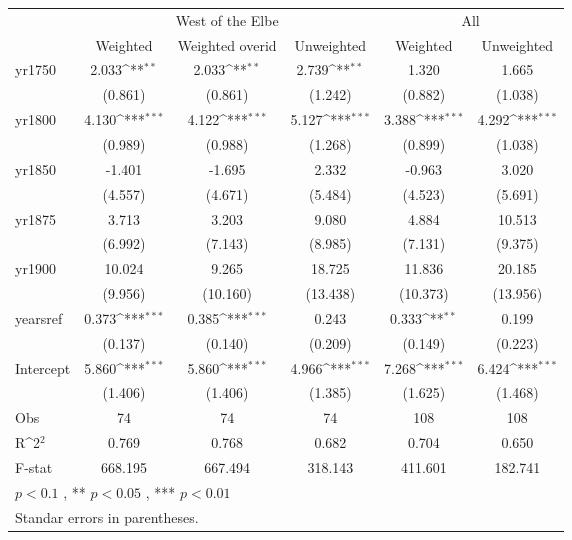 {
\def\sym#1{\ifmmode^{#1}\else\(^{#1}\)\fi}
\begin{tabular}{@{\extracolsep{2pt}}l*{5}{c}@{}}
\hline\hline
& \multicolumn{3}{c}{West of the Elbe} & \multicolumn{2}{c}{All} \\
\cline{2-4}
\cline{5-6}
 & Weighted & Weighted overid & Unweighted & Weighted & Unweighted \\
\hline
yr1750 & 2.033\sym{**} & 2.033\sym{**} & 2.739\sym{**} & 1.320 & 1.665 \\
 & (0.861) & (0.861) & (1.242) & (0.882) & (1.038) \\
yr1800 & 4.130\sym{***} & 4.122\sym{***} & 5.127\sym{***} & 3.388\sym{***} & 4.292\sym{***} \\
 & (0.989) & (0.988) & (1.268) & (0.899) & (1.038) \\
yr1850 & -1.401 & -1.695 & 2.332 & -0.963 & 3.020 \\
 & (4.557) & (4.671) & (5.484) & (4.523) & (5.691) \\
yr1875 & 3.713 & 3.203 & 9.080 & 4.884 & 10.513 \\
 & (6.992) & (7.143) & (8.985) & (7.131) & (9.375) \\
yr1900 & 10.024 & 9.265 & 18.725 & 11.836 & 20.185 \\
 & (9.956) & (10.160) & (13.438) & (10.373) & (13.956) \\
yearsref & 0.373\sym{***} & 0.385\sym{***} & 0.243 & 0.333\sym{**} & 0.199 \\
 & (0.137) & (0.140) & (0.209) & (0.149) & (0.223) \\
Intercept & 5.860\sym{***} & 5.860\sym{***} & 4.966\sym{***} & 7.268\sym{***} & 6.424\sym{***} \\
 & (1.406) & (1.406) & (1.385) & (1.625) & (1.468) \\

\hline
Obs & 74 & 74 & 74 & 108 & 108 \\
R\sym{2} & 0.769 & 0.768 & 0.682 & 0.704 & 0.650 \\
F-stat & 668.195 & 667.494 & 318.143 & 411.601 & 182.741 \\
\hline\hline
\multicolumn{6}{l}{\footnotesize *$p < 0.1$ , ** $p < 0.05$ , *** $p < 0.01$} \\
\multicolumn{6}{l}{\footnotesize Standar errors in parentheses.} \\
\end{tabular}
}